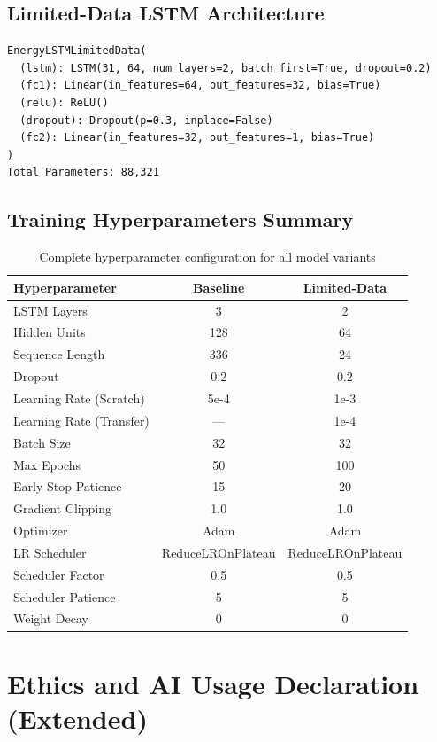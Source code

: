 \documentclass[12pt,a4paper]{report}
\begin{document}
\section{Limited-Data LSTM Architecture}

\begin{verbatim}
EnergyLSTMLimitedData(
  (lstm): LSTM(31, 64, num_layers=2, batch_first=True, dropout=0.2)
  (fc1): Linear(in_features=64, out_features=32, bias=True)
  (relu): ReLU()
  (dropout): Dropout(p=0.3, inplace=False)
  (fc2): Linear(in_features=32, out_features=1, bias=True)
)
Total Parameters: 88,321
\end{verbatim}

\section{Training Hyperparameters Summary}

\begin{table}[H]
\centering
\caption{Complete hyperparameter configuration for all model variants}
\begin{tabular}{lcc}
\toprule
\textbf{Hyperparameter} & \textbf{Baseline} & \textbf{Limited-Data} \\
\midrule
LSTM Layers & 3 & 2 \\
Hidden Units & 128 & 64 \\
Sequence Length & 336 & 24 \\
Dropout & 0.2 & 0.2 \\
Learning Rate (Scratch) & 5e-4 & 1e-3 \\
Learning Rate (Transfer) & --- & 1e-4 \\
Batch Size & 32 & 32 \\
Max Epochs & 50 & 100 \\
Early Stop Patience & 15 & 20 \\
Gradient Clipping & 1.0 & 1.0 \\
Optimizer & Adam & Adam \\
LR Scheduler & ReduceLROnPlateau & ReduceLROnPlateau \\
Scheduler Factor & 0.5 & 0.5 \\
Scheduler Patience & 5 & 5 \\
Weight Decay & 0 & 0 \\
\bottomrule
\end{tabular}
\end{table}

\chapter{Ethics and AI Usage Declaration (Extended)}
\end{document}
